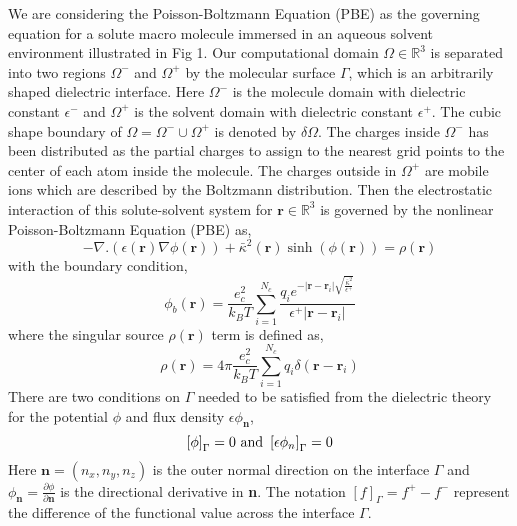 We are considering the Poisson-Boltzmann Equation (PBE) as the governing equation for a solute macro molecule immersed in an aqueous solvent environment illustrated in Fig 1. Our computational domain $\Omega \in \mathbb{R}^3$ is separated into two regions $\Omega^-$ and $\Omega^+$ by the molecular surface $\Gamma$, which is an arbitrarily shaped dielectric interface. Here $\Omega^-$ is the molecule domain with dielectric constant $\epsilon^-$ and $\Omega^+$ is the solvent domain with dielectric constant $\epsilon^+$. The cubic shape boundary of $\Omega= \Omega^-\cup \Omega^+ $ is denoted by $\delta \Omega$. The charges inside $\Omega^-$ has been distributed as the partial charges to assign to the nearest grid points to the center of each atom inside the molecule. The charges outside in $\Omega^+$ are mobile ions which are described by the Boltzmann distribution. Then the electrostatic interaction of this solute-solvent system for $\textbf{r} \in \mathbb{R}^3$ is governed by the nonlinear Poisson-Boltzmann Equation (PBE) as, 
\begin{equation}
			-\nabla.(\epsilon(\textbf{r})\nabla \phi(\textbf{r}))+\bar\kappa^2(\textbf{r}) \sinh (\phi(\textbf{r}))=\rho(\textbf{r})\label{pbe} %
\end{equation}
with the boundary condition,
\begin{equation}
	\phi_b (\textbf{r}) = \frac{e_c^2}{k_B T} \sum_{i=1}^{N_c} \frac{q_i e^{-|\textbf{r}-\textbf{r}_i | \sqrt{\frac{\bar\kappa^2}{\epsilon^+}} }}{\epsilon^{+}|\textbf{r}-\textbf{r}_i|} \label{bd_cond}
\end{equation}
where the singular source $\rho(\textbf{r})$ term is defined as,
\begin{equation}
	\rho(\textbf{r})= 4\pi \frac{e_c^2}{k_B T}\sum_{i=1}^{N_c} q_i \delta(\textbf{r}-\textbf{r}_i) \label{rho}
\end{equation}
There are two conditions on $\Gamma$ needed to be satisfied from the dielectric theory for the potential $\phi$ and flux density $\epsilon \phi_\textbf{n} $, 
\begin{equation}
\left[\phi \right]_\Gamma = 0 \textnormal{ and } \left[\epsilon\phi_n\right]_\Gamma = 0 \label{ju_cond}
\end{equation}
Here $\textbf{n}=(n_x,n_y,n_z)$ is the outer normal direction on the interface $\Gamma$ and $\phi_\textbf{n}= \frac{\partial \phi}{\partial\textbf{n}} $ is the directional derivative in \textbf{n}. The notation $[f]_\Gamma = f^+-f^-$ represent the difference of the functional value across the interface $\Gamma$. 

